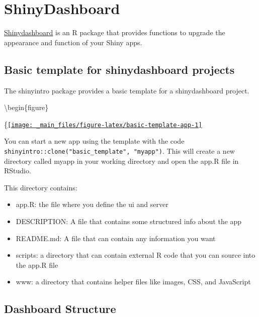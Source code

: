 \documentclass[
]{book}
\providecommand{\tightlist}{%
  \setlength{\itemsep}{0pt}\setlength{\parskip}{0pt}}
\begin{document}
\hypertarget{shinydashboard}{%
\chapter{ShinyDashboard}\label{shinydashboard}}

\href{https://rstudio.github.io/shinydashboard/}{Shinydashboard} is an R package that provides functions to upgrade the appearance and function of your Shiny apps.

\hypertarget{basic-template-for-shinydashboard-projects}{%
\section{Basic template for shinydashboard projects}\label{basic-template-for-shinydashboard-projects}}

The shinyintro package provides a basic template for a shinydashboard project.

\textbackslash begin\{figure\}

\{\centering \href{https://shiny.psy.gla.ac.uk/debruine/basic_template/}{\texttt{[image: \_main\_files/figure-latex/basic-template-app-1]} }

You can start a new app using the template with the code \texttt{shinyintro::clone("basic\_template",\ "myapp")}. This will create a new directory called myapp in your working directory and open the app.R file in RStudio.

This directory contains:

\begin{itemize}
\tightlist
\item
  app.R: the file where you define the ui and server
\item
  DESCRIPTION: A file that contains some structured info about the app
\item
  README.md: A file that can contain any information you want
\item
  scripts: a directory that can contain external R code that you can source into the app.R file
\item
  www: a directory that contains helper files like images, CSS, and JavaScript
\end{itemize}

\hypertarget{dashboard-structure}{%
\section{Dashboard Structure}\label{dashboard-structure}}
\end{document}
